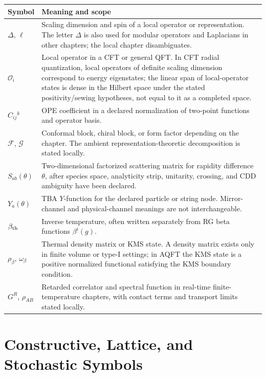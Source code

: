 \begin{longtable}{>{\raggedright\arraybackslash}p{}
                  >{\raggedright\arraybackslash}p{}}
\hline
\textbf{Symbol} & \textbf{Meaning and scope}\\
\hline
\endhead
\(\Delta\), \(\ell\) &
Scaling dimension and spin of a local operator or representation.  The
letter \(\Delta\) is also used for modular operators and Laplacians in other
chapters; the local chapter disambiguates.\\
\(\mathcal O_i\) &
Local operator in a CFT or general QFT.  In CFT radial quantization, local
operators of definite scaling dimension correspond to energy eigenstates; the
linear span of local-operator states is dense in the Hilbert space under the
stated positivity/sewing hypotheses, not equal to it as a completed space.\\
\(C_{ij}{}^k\) &
OPE coefficient in a declared normalization of two-point functions and
operator basis.\\
\(\mathcal F\), \(\mathcal G\) &
Conformal block, chiral block, or form factor depending on the chapter.  The
ambient representation-theoretic decomposition is stated locally.\\
\(S_{ab}(\theta)\) &
Two-dimensional factorized scattering matrix for rapidity difference
\(\theta\), after species space, analyticity strip, unitarity, crossing, and
CDD ambiguity have been declared.\\
\(Y_a(\theta)\) &
TBA \(Y\)-function for the declared particle or string node.  Mirror-channel
and physical-channel meanings are not interchangeable.\\
\(\beta_{\rm th}\) &
Inverse temperature, often written separately from RG beta functions
\(\beta^i(g)\).\\
\(\rho_\beta\), \(\omega_\beta\) &
Thermal density matrix or KMS state.  A density matrix exists only in finite
volume or type-I settings; in AQFT the KMS state is a positive normalized
functional satisfying the KMS boundary condition.\\
\(G^R\), \(\rho_{AB}\) &
Retarded correlator and spectral function in real-time finite-temperature
chapters, with contact terms and transport limits stated locally.\\
\hline
\end{longtable}

\section*{Constructive, Lattice, and Stochastic Symbols}

